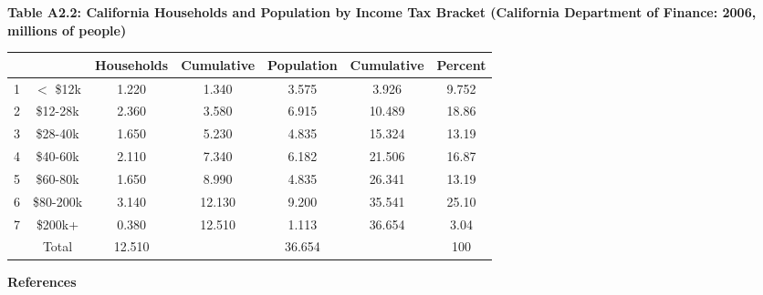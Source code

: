\documentclass{article}
\begin{document}
\begin{center}
\begin{small}
\textbf{Table A2.2: California Households and Population by Income Tax Bracket (California Department of Finance: 2006, millions of people)}\\[10pt]
\begin{tabular}{|c|c|c|c|c|c|c|}
\hline & & Households & Cumulative & Population & Cumulative & Percent \\
\hline 1 &  $<$ \$12k & 1.220 & 1.340 & 3.575 & 3.926 & 9.752 \\
\hline 2 & \$12-28k & 2.360 & 3.580 & 6.915 & 10.489 & 18.86 \\
\hline 3 & \$28-40k & 1.650 & 5.230 & 4.835 & 15.324 & 13.19 \\
\hline 4 & \$40-60k & 2.110 & 7.340 & 6.182 & 21.506 & 16.87 \\
\hline 5 & \$60-80k & 1.650 & 8.990 & 4.835 & 26.341 & 13.19 \\
\hline 6 & \$80-200k & 3.140 & 12.130 & 9.200 & 35.541 & 25.10 \\
\hline 7 & \$200k+ & 0.380 & 12.510 & 1.113 & 36.654 & 3.04 \\
\hline & Total & 12.510 & & 36.654 & & 100 \\
\hline
\end{tabular}
\end{small}
\end{center}

\newpage

\textbf{References}\\[20pt]
\end{document}

